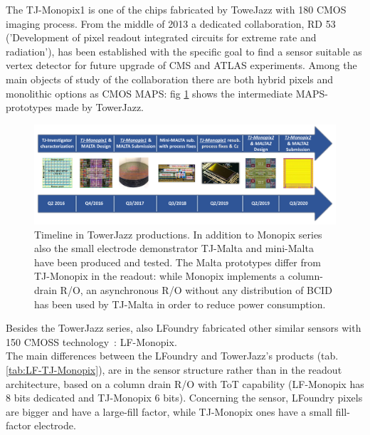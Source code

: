 
The TJ-Monopix1 is one of the chips fabricated by ToweJazz with 180 CMOS imaging process. From the middle of 2013 a dedicated collaboration, RD 53 ('Development of pixel readout integrated circuits for extreme rate and radiation'), has been established with the specific goal to find a sensor suitable as vertex detector for future upgrade of CMS and ATLAS experiments. Among the main objects of study of the collaboration there are both hybrid pixels and monolithic options as CMOS MAPS: fig \ref{fig:TJ180nm} shows the intermediate MAPS-prototypes made by TowerJazz.\\
\begin{figure}[h!]
    \centering
    \includegraphics[width=.95\linewidth]{figures/Monopix1/TJ180nm.png}
    \caption{Timeline in TowerJazz productions.  In addition to Monopix series also the small electrode demonstrator TJ-Malta and mini-Malta have been produced and tested\cite{MALTA}. The Malta prototypes differ from TJ-Monopix in the readout: while Monopix implements a column-drain R/O, an asynchronous R/O without any distribution of BCID has been used by TJ-Malta in order to reduce power consumption.}
    \label{fig:TJ180nm}
\end{figure} 
Besides the TowerJazz series, also LFoundry fabricated other similar sensors with 150 CMOSS technology~\cite{LF-Monopix}\cite{LF-TJ-Monopix}: LF-Monopix.\\
The main differences between the LFoundry and TowerJazz's products (tab. \ref{tab:LF-TJ-Monopix}), are in the sensor structure rather than in the readout architecture, based on a column drain R/O with ToT capability (LF-Monopix has 8 bits dedicated and TJ-Monopix 6 bits). Concerning the sensor, LFoundry pixels are bigger and have a large-fill factor, while TJ-Monopix ones have a small fill-factor electrode.

